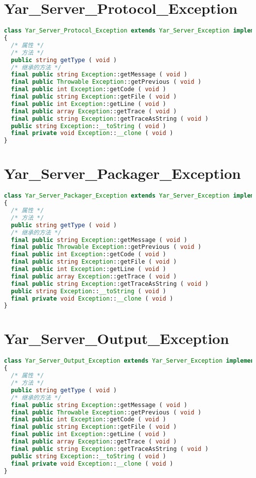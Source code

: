 \chapter{Yar\_Server\_Protocol\_Exception}

\begin{lstlisting}[language=PHP]
class Yar_Server_Protocol_Exception extends Yar_Server_Exception implements Throwable
{
  /* 属性 */
  /* 方法 */
  public string getType ( void )
  /* 继承的方法 */
  final public string Exception::getMessage ( void )
  final public Throwable Exception::getPrevious ( void )
  final public int Exception::getCode ( void )
  final public string Exception::getFile ( void )
  final public int Exception::getLine ( void )
  final public array Exception::getTrace ( void )
  final public string Exception::getTraceAsString ( void )
  public string Exception::__toString ( void )
  final private void Exception::__clone ( void )
}
\end{lstlisting}


\chapter{Yar\_Server\_Packager\_Exception}


\begin{lstlisting}[language=PHP]
class Yar_Server_Packager_Exception extends Yar_Server_Exception implements Throwable
{
  /* 属性 */
  /* 方法 */
  public string getType ( void )
  /* 继承的方法 */
  final public string Exception::getMessage ( void )
  final public Throwable Exception::getPrevious ( void )
  final public int Exception::getCode ( void )
  final public string Exception::getFile ( void )
  final public int Exception::getLine ( void )
  final public array Exception::getTrace ( void )
  final public string Exception::getTraceAsString ( void )
  public string Exception::__toString ( void )
  final private void Exception::__clone ( void )
}
\end{lstlisting}


\chapter{Yar\_Server\_Output\_Exception}


\begin{lstlisting}[language=PHP]
class Yar_Server_Output_Exception extends Yar_Server_Exception implements Throwable
{
  /* 属性 */
  /* 方法 */
  public string getType ( void )
  /* 继承的方法 */
  final public string Exception::getMessage ( void )
  final public Throwable Exception::getPrevious ( void )
  final public int Exception::getCode ( void )
  final public string Exception::getFile ( void )
  final public int Exception::getLine ( void )
  final public array Exception::getTrace ( void )
  final public string Exception::getTraceAsString ( void )
  public string Exception::__toString ( void )
  final private void Exception::__clone ( void )
}
\end{lstlisting}



